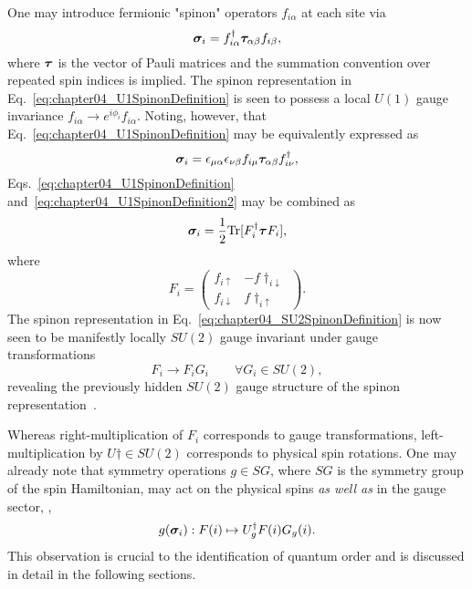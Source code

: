 One may introduce fermionic "spinon" operators $f_{i\alpha}$ at each site via
%
\begin{equation}
	\bm{\sigma}_i = f^{\dagger}_{i\alpha} \bm{\tau}_{\alpha\beta} f_{i\beta},
	\label{eq:chapter04_U1SpinonDefinition}
\end{equation}
%
where $\bm{\tau}$ is the vector of Pauli matrices and the summation convention over repeated spin indices is implied.
The spinon representation in Eq.~\eqref{eq:chapter04_U1SpinonDefinition} is seen to possess a local $U(1)$ gauge invariance $f_{i\alpha} \rightarrow e^{i \phi_i} f_{i\alpha}$.
Noting, however, that Eq.~\eqref{eq:chapter04_U1SpinonDefinition} may be equivalently expressed as
%
\begin{equation}
	\bm{\sigma}_i = \epsilon_{\mu\alpha}\epsilon_{\nu\beta} f_{i\mu} \bm{\tau}_{\alpha\beta} f^{\dagger}_{i\nu},
	\label{eq:chapter04_U1SpinonDefinition2}
\end{equation}
%
Eqs.~\eqref{eq:chapter04_U1SpinonDefinition} and~\eqref{eq:chapter04_U1SpinonDefinition2} may be combined as
%
\begin{equation}
	\bm{\sigma}_i = \frac{1}{2} \text{Tr}{[F\ensuremath{^{\dagger}}_i \bm{\tau}F_i]},
	\label{eq:chapter04_SU2SpinonDefinition}
\end{equation}
%
where
%
\begin{equation}
	F_i =
	\begin{pmatrix}
		f_{i\uparrow} &
		-f\dag_{i\downarrow} \\
		f_{i\downarrow} &
		f\dag_{i\uparrow}
	\end{pmatrix}.
\end{equation}
%
The spinon representation in Eq.~\eqref{eq:chapter04_SU2SpinonDefinition} is now seen to be manifestly locally $SU(2)$ gauge invariant under gauge transformations
%
\begin{equation}
	F_i \rightarrow F_i G_i \qquad \forall G_i \in SU(2),
\end{equation}
%
revealing the previously hidden $SU(2)$ gauge structure of the spinon representation~\cite{AffleckPRB1988}.

Whereas right-multiplication of $F_i$ corresponds to gauge transformations, left-multiplication by $U\dag \in SU(2)$ corresponds to physical spin rotations.
One may already note that symmetry operations $g \in SG$, where $SG$ is the symmetry group of the spin Hamiltonian, may act on the physical spins \textit{as well as} in the gauge sector, \ie,
%
\begin{equation}
	g(\bm{\sigma}_i): F(i) \mapsto U^{\dagger}_g F(i) G_g(i).
\end{equation}
%
This observation is crucial to the identification of quantum order and is discussed in detail in the following sections.


